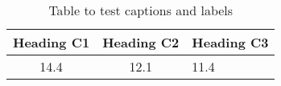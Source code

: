 \begin{table}[h!]
\centering
\begin{tabular}{cc}
{Heading C1} & {Heading C2} & {Heading C3} \\ 
\hline
{14.4} & {12.1} & {11.4} \\

\end{tabular}
\caption{Table to test captions and labels}
\label{table:1}
\end{table}